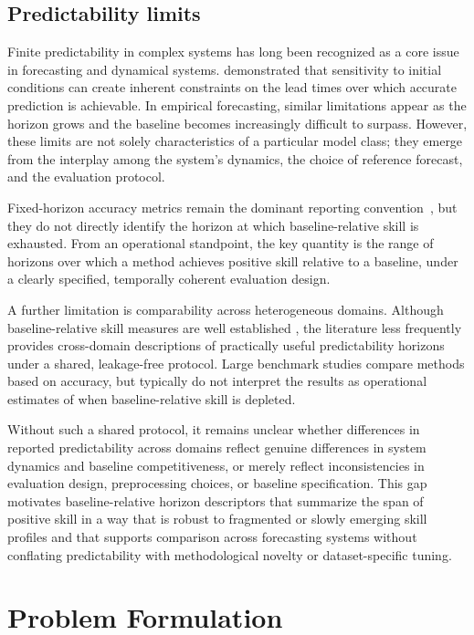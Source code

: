 \documentclass[pdflatex]{sn-jnl}
\begin{document}
\subsection{Predictability limits}

Finite predictability in complex systems has long been recognized as a
core issue in forecasting and dynamical systems. \citet{lorenz1969}
demonstrated that sensitivity to initial conditions can create inherent
constraints on the lead times over which accurate prediction is
achievable. In empirical forecasting, similar limitations appear as the
horizon grows and the baseline becomes increasingly difficult to surpass.
However, these limits are not solely characteristics of a particular
model class; they emerge from the interplay among the system's dynamics,
the choice of reference forecast, and the evaluation protocol.

Fixed-horizon accuracy metrics remain the dominant reporting convention~\citep{makridakis2020,godahewa2021},
but they do not directly identify the horizon at which baseline-relative
skill is exhausted. From an operational standpoint, the key quantity is
the range of horizons over which a method achieves positive skill
relative to a baseline, under a clearly specified, temporally coherent
evaluation design.

A further limitation is comparability across heterogeneous domains.
Although baseline-relative skill measures are well established
\citep{hyndman2006, murphy1993, tashman2000}, the literature less
frequently provides cross-domain descriptions of practically useful
predictability horizons under a shared, leakage-free protocol. Large
benchmark studies \citep{makridakis2020, godahewa2021} compare methods
based on accuracy, but typically do not interpret the results as
operational estimates of when baseline-relative skill is depleted.

Without such a shared protocol, it remains unclear whether differences in
reported predictability across domains reflect genuine differences in system
dynamics and baseline competitiveness, or merely reflect inconsistencies in
evaluation design, preprocessing choices, or baseline specification.
This gap motivates baseline-relative horizon descriptors that summarize
the span of positive skill in a way that is robust to fragmented or
slowly emerging skill profiles and that supports comparison across
forecasting systems without conflating predictability with
methodological novelty or dataset-specific tuning.

\section{Problem Formulation}
\end{document}
